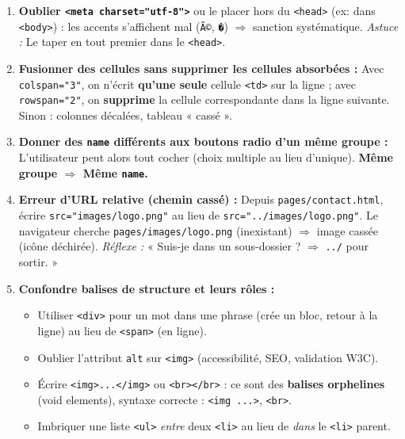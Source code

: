 \documentclass[11pt]{article}
\begin{document}
\begin{attention}
\begin{enumerate}
  \item \textbf{Oublier \texttt{<meta charset="utf-8">}} ou le placer hors du \texttt{<head>} (ex: dans \texttt{<body>}) : les accents s'affichent mal (\texttt{Ã©}, \texttt{�}) $\Rightarrow$ sanction systématique. \emph{Astuce :} Le taper en tout premier dans le \texttt{<head>}.
  \item \textbf{Fusionner des cellules sans supprimer les cellules absorbées :} Avec \texttt{colspan="3"}, on n'écrit \textbf{qu'une seule} cellule \texttt{<td>} sur la ligne ; avec \texttt{rowspan="2"}, on \textbf{supprime} la cellule correspondante dans la ligne suivante. Sinon : colonnes décalées, tableau « cassé ».
  \item \textbf{Donner des \texttt{name} différents aux boutons radio d'un même groupe :} L'utilisateur peut alors tout cocher (choix multiple au lieu d'unique). \textbf{Même groupe $\Rightarrow$ Même \texttt{name}.}
  \item \textbf{Erreur d'URL relative (chemin cassé) :} Depuis \texttt{pages/contact.html}, écrire \texttt{src="images/logo.png"} au lieu de \texttt{src="../images/logo.png"}. Le navigateur cherche \texttt{pages/images/logo.png} (inexistant) $\Rightarrow$ image cassée (icône déchirée). \emph{Réflexe :} « Suis-je dans un sous-dossier ? $\Rightarrow$ \texttt{../} pour sortir. »
  \item \textbf{Confondre balises de structure et leurs rôles :}
        \begin{itemize}
          \item Utiliser \texttt{<div>} pour un mot dans une phrase (crée un bloc, retour à la ligne) au lieu de \texttt{<span>} (en ligne).
          \item Oublier l'attribut \texttt{alt} sur \texttt{<img>} (accessibilité, SEO, validation W3C).
          \item Écrire \texttt{<img>...</img>} ou \texttt{<br></br>} : ce sont des \textbf{balises orphelines} (void elements), syntaxe correcte : \texttt{<img ...>}, \texttt{<br>}.
          \item Imbriquer une liste \texttt{<ul>} \emph{entre} deux \texttt{<li>} au lieu de \emph{dans} le \texttt{<li>} parent.
        \end{itemize}
\end{enumerate}
\end{attention}
\end{document}
